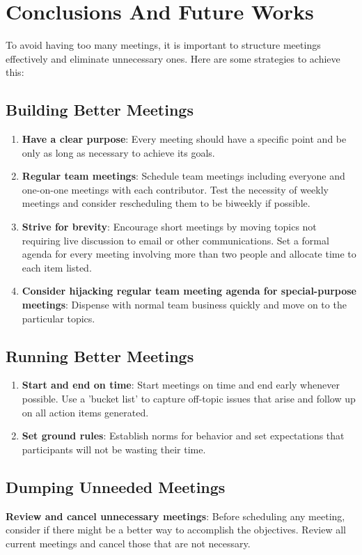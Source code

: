 \documentclass[runningheads]{llncs}
\begin{document}
\section{Conclusions And Future Works}
To avoid having too many meetings, it is important to structure meetings effectively and eliminate unnecessary ones. Here are some strategies to achieve this:
\subsection{Building Better Meetings}
\begin{enumerate}[noitemsep]
\item {\bf Have a clear purpose}: Every meeting should have a specific point and be only as long as necessary to achieve its goals.\\
\item {\bf Regular team meetings}: Schedule team meetings including everyone and one-on-one meetings with each contributor. Test the necessity of weekly meetings and consider rescheduling them to be biweekly if possible.\\
\item {\bf Strive for brevity}: Encourage short meetings by moving topics not requiring live discussion to email or other communications. Set a formal agenda for every meeting involving more than two people and allocate time to each item listed.\\
\item {\bf Consider hijacking regular team meeting agenda for special-purpose meetings}: Dispense with normal team business quickly and move on to the particular topics.\\
\end{enumerate}
\subsection{Running Better Meetings}
\begin{enumerate}[noitemsep]
\item {\bf Start and end on time}: Start meetings on time and end early whenever possible. Use a 'bucket list' to capture off-topic issues that arise and follow up on all action items generated.\\
\item {\bf Set ground rules}: Establish norms for behavior and set expectations that participants will not be wasting their time.\\
\end{enumerate}
\subsection{Dumping Unneeded Meetings}
{\bf Review and cancel unnecessary meetings}: Before scheduling any meeting, consider if there might be a better way to accomplish the objectives. Review all current meetings and cancel those that are not necessary.\\
\end{document}
